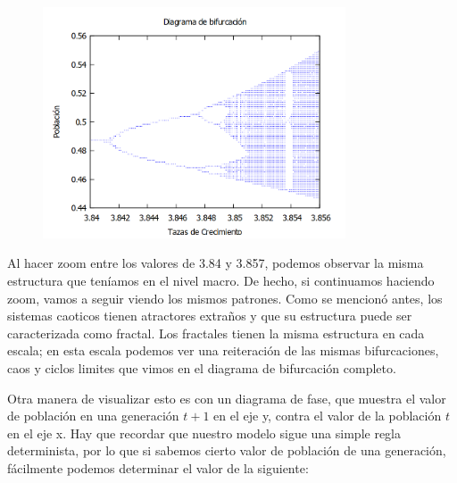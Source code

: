 \documentclass[a4paper]{article}
\begin{document}
\begin{figure}[!ht]
 \centering
  \includegraphics[width=0.8\textwidth]{Bifurcacion384-3856.png}
\end{figure}

Al hacer zoom entre los valores de 3.84 y 3.857, podemos observar la misma estructura que teníamos en el nivel macro. De hecho, si continuamos haciendo zoom, vamos a seguir viendo los mismos patrones. Como se mencionó antes, los sistemas caoticos tienen atractores extraños y que su estructura puede ser caracterizada como fractal. Los fractales tienen la misma estructura en cada escala; en esta escala podemos ver una reiteración de las mismas bifurcaciones, caos y ciclos limites que vimos en el diagrama de bifurcación completo. 

Otra manera de visualizar esto es con un diagrama de fase, que muestra el valor de población en una generación $t+1$ en el eje y, contra el valor de la población $t$ en el eje x. Hay que recordar que nuestro modelo sigue una simple regla determinista, por lo que si sabemos cierto valor de población de una generación, fácilmente podemos determinar el valor de la siguiente:
\end{document}
